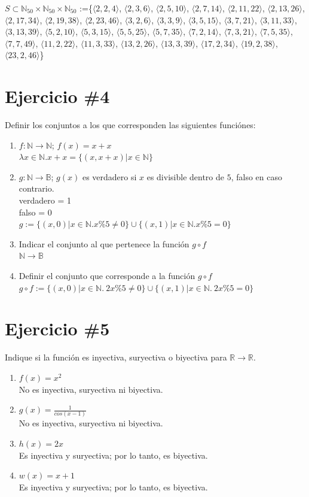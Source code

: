 \documentclass{article}
\begin{document}
$S\subset \mathbb{N}_{50}\times\mathbb{N}_{50}\times\mathbb{N}_{50}$ :=\{$\langle2,2,4\rangle$, $\langle2,3,6\rangle$, $\langle2,5,10\rangle$, $\langle2,7,14\rangle$, $\langle2,11,22\rangle$, $\langle2,13,26\rangle$, $\langle2,17,34\rangle$, $\langle2,19,38\rangle$, $\langle2,23,46\rangle$, $\langle3,2,6\rangle$, $\langle3,3,9\rangle$, $\langle3,5,15\rangle$, $\langle3,7,21\rangle$, $\langle3,11,33\rangle$, $\langle3,13,39\rangle$, $\langle5,2,10\rangle$, $\langle5,3,15\rangle$, $\langle5,5,25\rangle$, $\langle5,7,35\rangle$, $\langle7,2,14\rangle$, $\langle7,3,21\rangle$, $\langle7,5,35\rangle$, $\langle7,7,49\rangle$, $\langle11,2,22\rangle$, $\langle11,3,33\rangle$, $\langle13,2,26\rangle$, $\langle13,3,39\rangle$, $\langle17,2,34\rangle$, $\langle19,2,38\rangle$, $\langle23,2,46\rangle$\}
\section*{Ejercicio \#4}
Definir los conjuntos a los que corresponden las
siguientes funci\'ones:
\begin{enumerate}
        \item{$f:\mathbb{N}\rightarrow\mathbb{N}$; $f(x)=x+x$}\\
        $\lambda x\in\mathbb{N}.x+x=\{(x,x+x)|x\in\mathbb{N}\}$
        \item{$g:\mathbb{N}\rightarrow\mathbb{B}$; $g(x)$} es verdadero si
        $x$ es divisible dentro de $5$, falso en caso contrario.\\
        verdadero = 1\\
        falso = 0\\
        $g:=\{(x,0)|x\in\mathbb{N}. x\%5\neq0\}\cup\{(x,1)|x\in\mathbb{N}. x\%5=0\}$
        \item{Indicar el conjunto al que pertenece la función $g\circ f$}\\
        $\mathbb{N}\rightarrow\mathbb{B}$
        \item{Definir el conjunto que corresponde a la función $g\circ f$}\\
        $g\circ f:=\{(x,0)|x\in\mathbb{N}. \ 2x\%5\neq0\}\cup\{(x,1)|x\in\mathbb{N}. \ 2x\%5=0\}$
\end{enumerate}
\section*{Ejercicio \#5}
Indique si la función es inyectiva, suryectiva o biyectiva para $\mathbb{R}\rightarrow \mathbb{R}$. 
\begin{enumerate}
        \item{$f(x)=x^2$}\\ No es inyectiva, suryectiva ni biyectiva.
        \item{$g(x)=\frac{1}{cos(x-1)}$}\\No es inyectiva, suryectiva ni biyectiva.
        \item{$h(x)=2x$}\\ Es inyectiva y suryectiva; por lo tanto, es biyectiva.
        \item{$w(x)=x+1$}\\Es inyectiva y suryectiva; por lo tanto, es biyectiva.
\end{enumerate}
\end{document}
